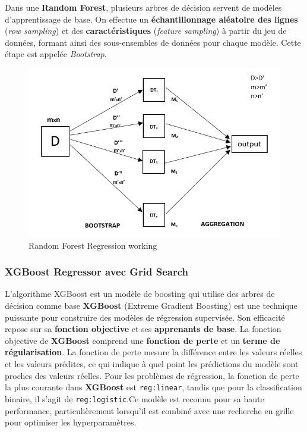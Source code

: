 Dans une \textbf{Random Forest}, plusieurs arbres de décision servent de modèles d'apprentissage de base. On effectue un \textbf{échantillonnage aléatoire des lignes} (\textit{row sampling}) et des \textbf{caractéristiques} (\textit{feature sampling}) à partir du jeu de données, formant ainsi des sous-ensembles de données pour chaque modèle. Cette étape est appelée \textit{Bootstrap}.
\begin{figure}[h!]
	\centering
	\includegraphics[width=0.7\linewidth]{images/schema_random_forest}
	\caption[Random Forest Regression]{Random Forest Regression working}
	\label{fig:schemarandomforest}
\end{figure}

\newpage
\subsubsection{XGBoost Regressor avec Grid Search}

L'algorithme XGBoost  est un modèle de boosting qui utilise des arbres de décision comme base
\textbf{XGBoost} (Extreme Gradient Boosting) est une technique puissante pour construire des modèles de régression supervisée. Son efficacité repose sur sa \textbf{fonction objective} et ses \textbf{apprenants de base}. La fonction objective de \textbf{XGBoost} comprend une \textbf{fonction de perte} et un \textbf{terme de régularisation}. La fonction de perte mesure la différence entre les valeurs réelles et les valeurs prédites, ce qui indique à quel point les prédictions du modèle sont proches des valeurs réelles. Pour les problèmes de régression, la fonction de perte la plus courante dans \textbf{XGBoost} est \texttt{reg:linear}, tandis que pour la classification binaire, il s'agit de \texttt{reg:logistic}.Ce modèle est reconnu pour sa haute performance, particulièrement lorsqu'il est combiné avec une recherche en grille pour optimiser les hyperparamètres.


